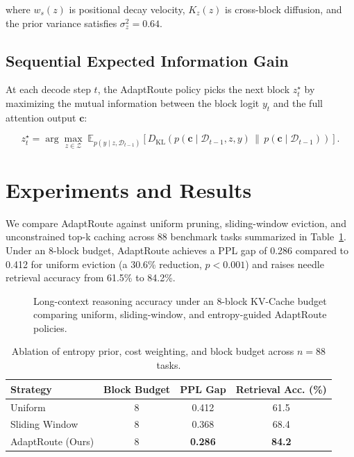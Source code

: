 \documentclass[11pt]{article}
\begin{document}
where $w_s(z)$ is positional decay velocity, $K_z(z)$ is cross-block diffusion, and the prior variance satisfies $\sigma_z^2 = 0.64$.

\subsection{Sequential Expected Information Gain}
At each decode step $t$, the AdaptRoute policy picks the next block $z_t^\star$ by maximizing the mutual information between the block logit $y_t$ and the full attention output $\mathbf{c}$:

\begin{equation}
\label{eq:eig}
z_t^\star = \arg\max_{z \in \mathcal{Z}} \; \mathbb{E}_{p(y \mid z, \mathcal{D}_{t-1})}\!\left[ D_{\text{KL}}\!\left(p(\mathbf{c} \mid \mathcal{D}_{t-1}, z, y) \,\|\, p(\mathbf{c} \mid \mathcal{D}_{t-1})\right) \right].
\end{equation}

\section{Experiments and Results}
\label{sec:results}

We compare AdaptRoute against uniform pruning, sliding-window eviction, and unconstrained top-k caching across 88 benchmark tasks summarized in Table~\ref{tab:ablation}. Under an 8-block budget, AdaptRoute achieves a PPL gap of 0.286 compared to 0.412 for uniform eviction (a 30.6\% reduction, $p < 0.001$) and raises needle retrieval accuracy from 61.5\% to 84.2\%.

\begin{figure}[t]
\caption{Long-context reasoning accuracy under an 8-block KV-Cache budget comparing uniform, sliding-window, and entropy-guided AdaptRoute policies.}
\label{fig:profile_overview}
\end{figure}

\begin{table}[t]
\caption{Ablation of entropy prior, cost weighting, and block budget across $n = 88$ tasks.}
\label{tab:ablation}
\begin{tabular}{lccc}
\toprule
Strategy & Block Budget & PPL Gap & Retrieval Acc. (\%) \\
\midrule
Uniform & 8 & 0.412 & 61.5 \\
Sliding Window & 8 & 0.368 & 68.4 \\
AdaptRoute (Ours) & 8 & \textbf{0.286} & \textbf{84.2} \\
\bottomrule
\end{tabular}
\end{table}
\end{document}
